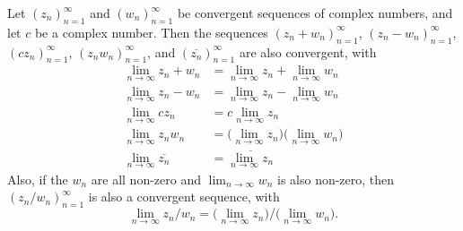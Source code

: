 \begin{lemma}\label{4.6.14}
    Let \((z_n)_{n = 1}^\infty\) and \((w_n)_{n = 1}^\infty\) be convergent sequences of complex numbers, and let \(c\) be a complex number.
    Then the sequences \((z_n + w_n)_{n = 1}^\infty\), \((z_n - w_n)_{n = 1}^\infty\), \((c z_n)_{n = 1}^\infty\), \((z_n w_n)_{n = 1}^\infty\), and \((\overline{z_n})_{n = 1}^\infty\) are also convergent, with
    \begin{align*}
        \lim_{n \to \infty} z_n + w_n      & = \lim_{n \to \infty} z_n + \lim_{n \to \infty} w_n                       \\
        \lim_{n \to \infty} z_n - w_n      & = \lim_{n \to \infty} z_n - \lim_{n \to \infty} w_n                       \\
        \lim_{n \to \infty} c z_n          & = c \lim_{n \to \infty} z_n                                               \\
        \lim_{n \to \infty} z_n w_n        & = \bigg(\lim_{n \to \infty} z_n\bigg) \bigg(\lim_{n \to \infty} w_n\bigg) \\
        \lim_{n \to \infty} \overline{z_n} & = \overline{\lim_{n \to \infty} z_n}
    \end{align*}
    Also, if the \(w_n\) are all non-zero and \(\lim_{n \to \infty} w_n\) is also non-zero, then \((z_n / w_n)_{n = 1}^\infty\) is also a convergent sequence, with
    \[
        \lim_{n \to \infty} z_n / w_n = \bigg(\lim_{n \to \infty} z_n\bigg) / \bigg(\lim_{n \to \infty} w_n\bigg).
    \]
\end{lemma}

